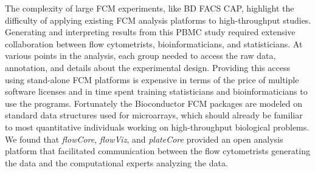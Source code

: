 \documentclass[12pt]{article}
\newcommand{\Rpackage}[1]{{\textit{#1}}}
\begin{document}
The complexity of large FCM experiments, like BD FACS CAP, highlight the 
difficulty of applying existing FCM analysis platforms to high-throughput
studies. Generating and interpreting results from this PBMC study required
extensive collaboration between flow cytometrists, bioinformaticians, and
statisticians. At various points in the analysis, each group needed to access
the raw data, annotation, and details about the experimental design. Providing
this access using stand-alone FCM platforms is expensive in terms of the price
of multiple software licenses and in time spent training statisticians and
bioinformaticians to use the programs. Fortunately the Bioconductor FCM
packages are modeled on standard data structures used for microarrays, which
should already be familiar to most quantitative individuals working on
high-throughput biological problems. We found that \Rpackage{flowCore},
\Rpackage{flowViz}, and \Rpackage{plateCore} provided an open analysis platform
that facilitated communication between the flow cytometrists generating the
data and the computational experts analyzing the data.
\end{document}
